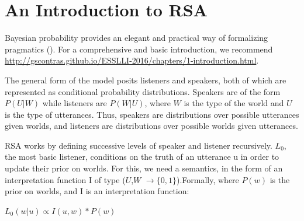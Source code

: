 \documentclass[10pt,letterpaper,twocolumn]{article}
\begin{document}






\section{An Introduction to RSA} \label{rsa}

Bayesian probability provides an elegant and practical way of formalizing pragmatics (\cite{frank2012predicting}). For a comprehensive and basic introduction, we recommend \url{http://gscontras.github.io/ESSLLI-2016/chapters/1-introduction.html}.

The general form of the model posits listeners and speakers, both of which are represented as conditional probability distributions. Speakers are of the form $P(U\vert W)$ while listeners are $P(W\vert U)$, where $W$ is the type of the world and $U$ is the type of utterances. Thus, speakers are distributions over possible utterances given worlds, and listeners are distributions over possible worlds given utterances.

RSA works by defining successive levels of speaker and listener recursively. $L_0$, the most basic listener, conditions on the truth of an utterance u in order to update their prior on worlds. For this, we need a semantics, in the form of an interpretation function I of type ($U$,$W$ $\to \{0,1\}$).Formally, where $P(w)$ is the prior on worlds, and I is an interpretation function:

\begin{exe}
\ex  $L_0(w\vert u) \propto  I(u,w)*P(w)$ \label{l0def}
\end{exe}
\end{document}
